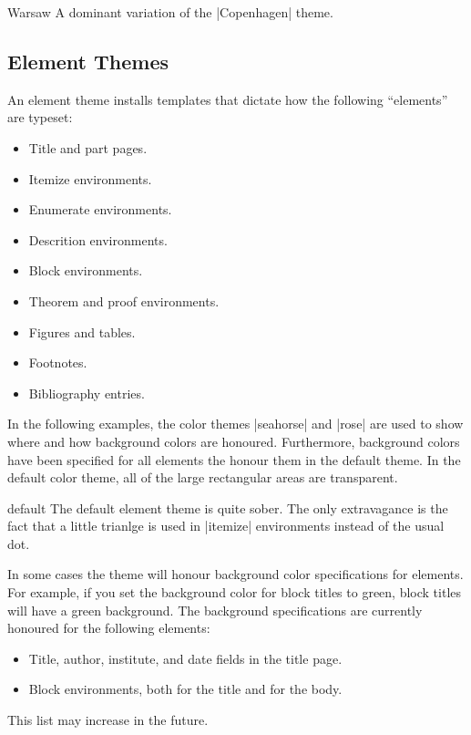 \begin{themeexample}{Warsaw}
  A dominant variation of the |Copenhagen| theme.
\end{themeexample}









\subsection{Element Themes}

An element theme installs templates that dictate how the following
``elements'' are typeset:
\begin{itemize}
\item Title and part pages.
\item Itemize environments.
\item Enumerate environments.
\item Descrition environments.
\item Block environments.
\item Theorem and proof environments.
\item Figures and tables.
\item Footnotes.
\item Bibliography entries.
\end{itemize}


In the following examples, the color themes |seahorse| and |rose| are
used to show where and how background colors are
honoured. Furthermore, background colors have been specified for all
elements the honour them in the default theme. In the default color
theme, all of the large rectangular areas are transparent.

\begin{elementthemeexample}{default}
  The default element theme is quite sober. The only extravagance is
  the fact that a little trianlge is used in |itemize| environments
  instead of the usual dot.

  In some cases the theme will honour background color specifications
  for elements. For example, if you set the background color for block
  titles to green, block titles will have a green background. The
  background specifications are currently honoured for the following
  elements: 
  \begin{itemize}
  \item Title, author, institute, and date fields in the title
    page.
  \item Block environments, both for the title and for the body.
  \end{itemize}
  This list may increase in the future.
\end{elementthemeexample}

